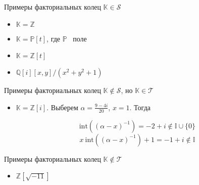 \documentclass[8pt, xcolor=x11names]{beamer}
\begin{document}
\begin{frame}
    \begin{block}{Примеры факториальных колец $\mathbb{K} \in \mathcal{S}$}
        \begin{itemize}
            \item $\mathbb{K}=\mathbb{Z}$
            
            \item $\mathbb{K}=\mathbb{P}[t]$, где $\mathbb{P}$ \textendash\ поле
            
            \item $\mathbb{K}=\mathbb{Z}[t]$
            
            \item $\mathbb{Q}[i][x, y]/(x^2 + y^2 + 1)$
        \end{itemize}
    \end{block}
    
    \begin{block}{Примеры факториальных колец $\mathbb{K} \not\in \mathcal{S}$, но $\mathbb{K} \in \mathcal{T}$}
        \begin{itemize}
            \item $\mathbb{K}=\mathbb{Z}[i]$.
            Выберем $\alpha=\frac{9-4i}{20}$, $x=1$.
            Тогда
            
            $$
                \textrm{int}((\alpha-x)^{-1})=-2+i \notin \mathbb{I} \cup \{0\}
            $$
            $$
                x \ \textrm{int}((\alpha-x)^{-1})+1=-1+i \notin \mathbb{I}
            $$
        \end{itemize}
    \end{block}
    
    \begin{block}{Примеры факториальных колец $\mathbb{K} \not\in \mathcal{T}$}
        \begin{itemize}
            \item $\mathbb{Z}[\sqrt{-11}]$
        \end{itemize}
    \end{block}
\end{frame}
\end{document}
